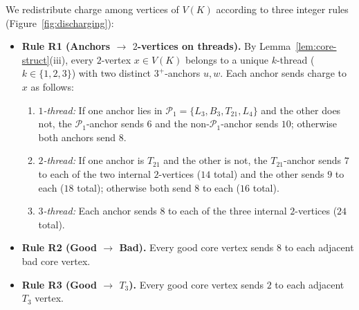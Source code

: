 \documentclass[11pt,a4paper]{article}
\theoremstyle{definition}
\newcommand{\Ppoor}{\mathcal{P}_1}
\begin{document}
We redistribute charge among vertices of $V(K)$ according to three integer rules (Figure~\ref{fig:discharging}):
\begin{itemize}[leftmargin=*,itemsep=3pt]
  \item \textbf{Rule R1 (Anchors $\to$ $2$-vertices on threads).} By Lemma~\ref{lem:core-struct}(iii), every $2$-vertex $x \in V(K)$ belongs to a unique $k$-thread ($k \in \{1, 2, 3\}$) with two distinct $3^+$-anchors $u, w$. Each anchor sends charge to $x$ as follows:
  \begin{enumerate}[label=\textbf{R1\alph*.},leftmargin=*,itemsep=1pt]
    \item \emph{$1$-thread:} If one anchor lies in $\Ppoor = \{L_3, B_3, T_{21}, L_4\}$ and the other does not, the $\Ppoor$-anchor sends $6$ and the non-$\Ppoor$-anchor sends $10$; otherwise both anchors send $8$.
    \item \emph{$2$-thread:} If one anchor is $T_{21}$ and the other is not, the $T_{21}$-anchor sends $7$ to each of the two internal $2$-vertices ($14$ total) and the other sends $9$ to each ($18$ total); otherwise both send $8$ to each ($16$ total).
    \item \emph{$3$-thread:} Each anchor sends $8$ to each of the three internal $2$-vertices ($24$ total).
  \end{enumerate}
  \item \textbf{Rule R2 (Good $\to$ Bad).} Every good core vertex sends $8$ to each adjacent bad core vertex.
  \item \textbf{Rule R3 (Good $\to$ $T_3$).} Every good core vertex sends $2$ to each adjacent $T_3$ vertex.
\end{itemize}
\end{document}
